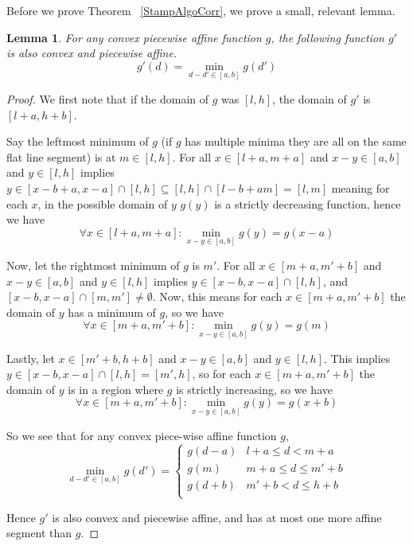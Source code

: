 \documentclass[conference]{IEEEtran}
\newcounter{cases}
\newtheorem{lemma}[theorem]{Lemma}
\begin{document}
	Before we prove Theorem ~\ref{StampAlgoCorr}, we prove a small, relevant lemma. 
	
	\begin{lemma}\label{minpwc}
		For any convex piecewise affine function $g$, the following function $g'$ is also convex and piecewise affine. 
		$$g'(d) = \min_{d-d' \in [a,b]} g(d')$$
		
	\end{lemma}
	
	\begin{proof}
		We first note that if the domain of $g$ was $[l, h]$, the domain of $g'$ is $[l + a, h + b]$. 
		
		Say the leftmost minimum of $g$ (if $g$ has multiple minima they are all on the same flat line segment) is at $m \in [l,h]$. 
		For all $x \in [l + a, m+ a] $ and $x - y \in [a, b]$ and $y \in [l,h]$ implies $y \in [x-b+a, x-a] \cap [l, h] \subseteq [l, h] \cap [l-b+a m] = [l,m]$ meaning for each $x$, in the possible domain of $y$ $g(y)$ is a strictly decreasing function, hence  we have $$\forall x \in [l + a, m+ a] : \min_{x - y \in [a,b]} g(y) = g(x - a) $$
		
		Now, let the rightmost minimum of $g$ is $m'$. 
		For all $x \in [m + a, m' + b] $ and $x - y \in [a, b]$ and $y \in [l,h]$ implies $y \in [x-b, x-a] \cap [l, h]$, and $[x - b, x - a] \cap [m, m'] \neq \emptyset$. 
		Now, this means for each $x \in [m+a, m' + b]$ the domain of $y$ has a minimum of $g$, so we have $$\forall x \in [m + a, m'+ b] : \min_{x - y \in [a,b]} g(y) = g(m) $$
		
		Lastly, let  $x \in [m' + b, h + b] $ and $x - y \in [a, b]$ and $y \in [l,h]$. 
		This implies $y \in [x-b, x-a] \cap [l, h] = [m', h]$, so for each $x \in [m+a, m' + b]$ the domain of $y$ is in a region where $g$ is strictly increasing, so we have $$\forall x \in [m + a, m'+ b] : \min_{x - y \in [a,b]} g(y) = g(x+b) $$
		
		So we see that for any convex piece-wise affine function $g$, $$\min_{d-d' \in [a,b]} g(d') = \begin{cases}
			g(d-a) & l + a \leq d < m + a \\
			g(m) & m+a \leq d \leq m' + b \\
			g(d+b) & m' + b < d \leq h + b   \\
		\end{cases}$$
		
		Hence $g'$ is also convex and piecewise affine, and has at most one more affine segment than $g$. 
	\end{proof}
	
\end{document}
